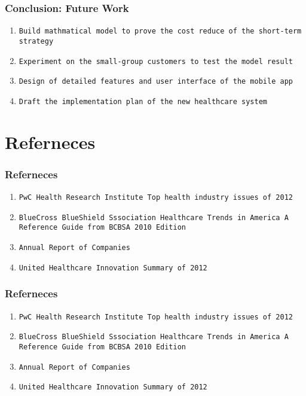 \documentclass[compress,handout,10pt]{beamer}
\let\olditem\item
\renewcommand{\item}{\setlength{\itemsep}{0.5\baselineskip}\olditem}
\begin{document}
\begin{frame}
    \frametitle{Conclusion: Future Work}
            \begin{enumerate}
                \item \texttt{Build mathmatical model to prove the cost reduce of the short-term strategy}    
                \item \texttt{Experiment on the small-group customers to test the model result }
                \item \texttt{Design of detailed features and user interface of the mobile app}   
                \item \texttt{Draft the implementation plan of the new healthcare system}              
            \end{enumerate}
\end{frame}

\section{\large Referneces}

\begin{frame}
    \frametitle{Referneces}
            \begin{enumerate}
                \item \texttt{PwC Health Research Institute Top health industry issues of 2012}    
                \item \texttt{BlueCross BlueShield Sssociation Healthcare Trends in America A Reference Guide from BCBSA 2010 Edition }
                \item \texttt{Annual Report of Companies }      
                 \item \texttt{United Healthcare Innovation Summary of 2012}     
            \end{enumerate}
\end{frame}


\begin{frame}
    \frametitle{Referneces}
            \begin{enumerate}
                \item \texttt{PwC Health Research Institute Top health industry issues of 2012}    
                \item \texttt{BlueCross BlueShield Sssociation Healthcare Trends in America A Reference Guide from BCBSA 2010 Edition }
                \item \texttt{Annual Report of Companies }      
                 \item \texttt{United Healthcare Innovation Summary of 2012}     
            \end{enumerate}
\end{frame}
\end{document}
